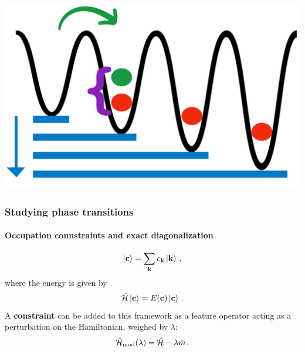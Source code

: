 \documentclass[aspectratio=169]{beamer}
\renewcommand\emph[1]{\textcolor{ugent_blue}{\textbf{#1}}}
\begin{document}
\begin{frame}
\begin{onlyenv}
\begin{equation}
  \end{equation}
  \begin{center}
    \includegraphics[scale=0.1]{../img/u.png}
  \end{center}
\end{onlyenv}
\end{frame}

\begin{frame}
  \frametitle{Studying phase transitions}
  \framesubtitle{Occupation connstraints and exact diagonalization}
  \begin{equation}
    \ket{\vb{c}} = \sum_{\vb{k}}c_{\vb{k}}\ket{\vb{k}}\thinspace ,
    \label{eq:fock_space}
  \end{equation}
  where the energy is given by
  \begin{equation}
    \hat{\mathcal{H}} \ket{\vb{c}} = E(\vb{c}) \ket{\vb{c}} \thinspace .
    \label{eq:FCI_energy}
  \end{equation}
  A \emph{constraint} can be added to this framework as a feature operator acting as a perturbation on the Hamiltonian, weighed by $\lambda$:
  \begin{equation} \label{eq:modified_hamiltonian}
    \hat{\mathcal{H}}_{\text{mod}}(\lambda) = \hat{\mathcal{H}} - \lambda \hat{m} \thinspace .
  \end{equation}
\end{frame}
\end{document}
